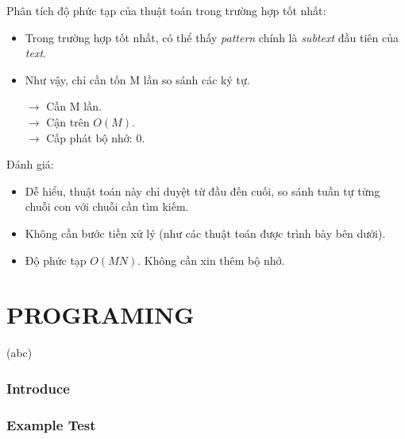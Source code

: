 \documentclass[a4paper,11pt]{article}
\begin{document}
\begin{enumerate}
			Phân tích độ phức tạp của thuật toán trong trường hợp tốt nhất:
			\begin{itemize}
				\item Trong trường hợp tốt nhất, có thể thấy \textit{pattern} chính là \textit{subtext} đầu tiên của \textit{text}.
				\item Như vậy, chỉ cần tốn M lần so sánh các ký tự.
				
				$\to$ Cần M lần. \\
				$\to$ Cận trên $O(M)$. \\
				$\to$ Cấp phát bộ nhớ: 0.
			\end{itemize}
			
			Đánh giá:
			\begin{itemize}
				\item Dễ hiểu, thuật toán này chỉ duyệt từ đầu đến cuối, so sánh tuần tự từng chuỗi con với chuỗi cần tìm kiếm.
				\item Không cần bước tiền xử lý (như các thuật toán được trình bày bên dưới).
				\item Độ phức tạp $O(MN)$. Không cần xin thêm bộ nhớ.
			\end{itemize}
	\end{enumerate}
	
	\part*{PROGRAMING}
	\label{Crossword game}(abc)
	
	
	\setcounter{section}{0}
	\section{Introduce}
	\section{Example Test}
	
\end{document}
